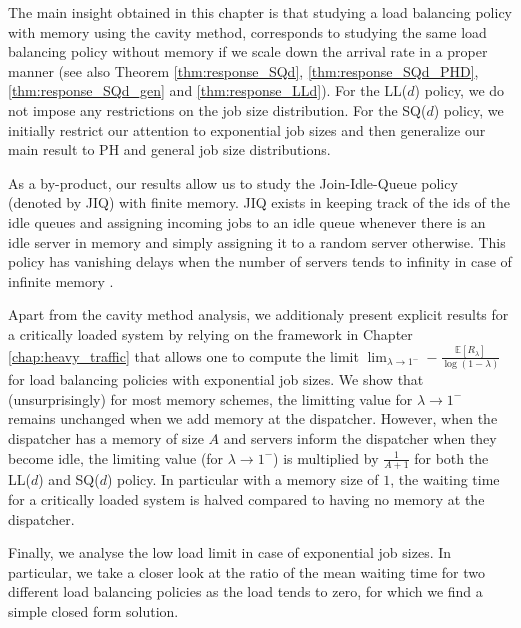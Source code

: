 \documentclass[12pt]{report}
\begin{document}
The main insight obtained in this chapter is that studying a load balancing policy with memory
using the cavity method, corresponds to studying the same load balancing policy without memory 
if we scale down the arrival rate in a proper manner (see also Theorem \ref{thm:response_SQd}, \ref{thm:response_SQd_PHD}, \ref{thm:response_SQd_gen} and \ref{thm:response_LLd}). For the LL($d$) policy, we do not impose any restrictions on the job size distribution. For the SQ($d$) policy, we initially restrict our attention to exponential job sizes and then generalize our main result to PH and general job size
distributions.

As a by-product, our results allow us to study the Join-Idle-Queue policy (denoted by JIQ) 
with finite memory. JIQ  exists in keeping track of the ids of the idle queues and assigning 
incoming jobs to an idle queue whenever there is an idle server in memory and simply assigning it to a random server otherwise. This policy has vanishing delays when the number of servers tends to infinity in case of infinite memory \cite{lu2011join, stolyar1, foss2017large, braverman2018steady}. 

Apart from the cavity method analysis, we additionaly present explicit results for
a critically loaded system by relying on the framework in Chapter \ref{chap:heavy_traffic} that allows one to compute the limit $\lim_{\lambda \rightarrow 1^-} - \frac{\mathbb{E}[R_\lambda]}{\log(1-\lambda)}$ for load balancing policies with exponential job sizes. 
We show that (unsurprisingly) for most memory schemes, the limitting value for $\lambda \rightarrow 1^-$ remains unchanged when we add memory at the dispatcher. However, when the dispatcher has a memory of size $A$ and servers inform the dispatcher when they become idle, the limiting value (for $\lambda \rightarrow 1^-$) is multiplied by $\frac{1}{A+1}$ for both the LL($d$) and SQ($d$) policy. In particular with a memory size of $1$, the waiting time for a critically loaded system is halved compared to having no memory at the dispatcher.

Finally, we analyse the low load limit in case of exponential job sizes. In particular, we take a closer look at the ratio of the mean waiting time for two different load balancing policies as the load tends to zero, for which we find a simple closed form solution.
\end{document}
